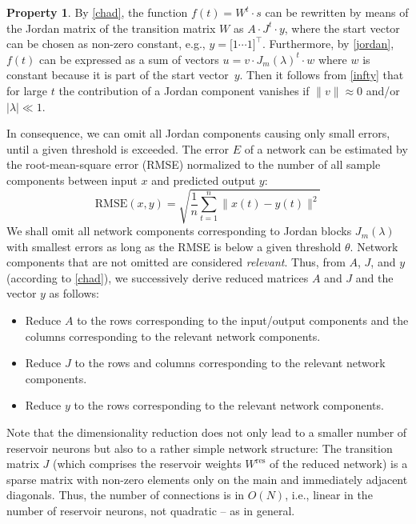 \documentclass[twoside,11pt]{article}
\theoremstyle{definition}
\newtheorem{prop}{Property}
\begin{document}
\begin{prop}
By \cref{chad}, the function $f(t) = W^t \cdot s$ can be rewritten by
means of the Jordan matrix of the transition matrix $W$ as $A \cdot J^t
\cdot y$, where the start vector can be chosen as non-zero constant, e.g., $y =
\big[ 1 \cdots 1 \big]^\top$. Furthermore, by \cref{jordan}, $f(t)$ can be
expressed as a sum of vectors $u = v \cdot J_m(\lambda)^t \cdot w$ where $w$ is
constant because it is part of the start vector~$y$. Then it follows from
\cref{infty} that for large $t$ the contribution of a Jordan component
vanishes if $\|v\| \approx 0$ and/or $|\lambda| \ll 1$.

In consequence, we can omit all Jordan components causing only small errors,
until a given threshold is exceeded. The error $E$ of a network can be estimated by the
root-mean-square error (RMSE) normalized to the number of all sample components
between input $x$ and predicted output $y$:
  \[ \mathrm{RMSE}(x,y) = \sqrt{\frac{1}{n} \sum_{t=1}^n \big\|x(t)-y(t)\big\|^2} \]
We shall omit all network components corresponding to Jordan blocks
$J_m(\lambda)$ with smallest errors as long as the
RMSE is below a given threshold $\theta$. Network components that are not
omitted are considered \emph{relevant}. Thus, from $A$, $J$, and
$y$ (according to \cref{chad}), we successively derive reduced matrices
$A$ and $J$ and the vector $y$ as follows:
\begin{itemize}
  \item Reduce $A$ to the rows corresponding to the input/output components and
	the columns corresponding to the relevant network components.
  \item Reduce $J$ to the rows and columns corresponding to the relevant
	network components.
  \item Reduce $y$ to the rows corresponding to the relevant network components.
\end{itemize}
\end{prop}

Note that the dimensionality reduction does not only lead to a smaller number of
reservoir neurons but also to a rather simple network structure: The transition
matrix $J$ (which comprises the reservoir weights $W^\mathrm{res}$ of
the reduced network) is a sparse matrix with non-zero elements only on the main
and immediately adjacent diagonals. Thus, the number of connections is in
$O(N)$, i.e., linear in the number of reservoir neurons, not quadratic -- as in
general.
\end{document}
